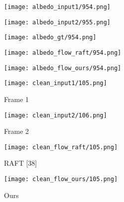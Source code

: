 \documentclass[10pt,twocolumn,letterpaper]{article}
\begin{document}
\begin{figure*}[ht!]
     \begin{subfigure}[b]{0.195\textwidth}
         \centering
         \texttt{[image: albedo\_input1/954.png]}
     \end{subfigure}\hfill
     \begin{subfigure}[b]{0.195\textwidth}
         \centering
         \texttt{[image: albedo\_input2/955.png]}
     \end{subfigure}\hfill
     \begin{subfigure}[b]{0.195\textwidth}
         \centering
         \texttt{[image: albedo\_gt/954.png]}
     \end{subfigure}\hfill
     \begin{subfigure}[b]{0.195\textwidth}
         \centering
         \texttt{[image: albedo\_flow\_raft/954.png]}
     \end{subfigure}\hfill
     \begin{subfigure}[b]{0.195\textwidth}
         \centering
         \texttt{[image: albedo\_flow\_ours/954.png]}
     \end{subfigure}

    \caption{\textbf{Additional visualisations evaluated on the Sintel Albedo training dataset.} }
    \label{Fig:vis_albedo}
\end{figure*} \begin{figure*}[ht!]
     \centering
     \begin{subfigure}[b]{0.245\textwidth}
         \centering
         \caption*{Frame 1}
         \texttt{[image: clean\_input1/105.png]}
     \end{subfigure}\hfill
     \begin{subfigure}[b]{0.245\textwidth}
         \centering
         \caption*{Frame 2}
         \texttt{[image: clean\_input2/106.png]}
     \end{subfigure}\hfill
     \begin{subfigure}[b]{0.245\textwidth}
         \centering
         \caption*{RAFT [38]}
         \texttt{[image: clean\_flow\_raft/105.png]}
     \end{subfigure}\hfill
     \begin{subfigure}[b]{0.245\textwidth}
         \centering
         \caption*{Ours}
         \texttt{[image: clean\_flow\_ours/105.png]}
     \end{subfigure}


\end{figure*}
\end{document}
